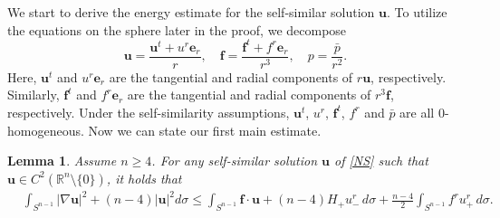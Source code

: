 \documentclass[12pt]{amsart}
\newtheorem{lemma}[theorem]{Lemma}
\newcommand{\Bu}{{\boldsymbol{u}}}
\newcommand{\Be}{{\boldsymbol{e}}}
\newcommand{\Bf}{{\boldsymbol{f}}}
\begin{document}
	
	
	
	
	
	
	
	
	We start to derive the energy estimate for the self-similar solution $\Bu$.  To utilize the equations on the sphere later in the proof, we
	decompose 
	$$\Bu = \frac{\Bu^{t} +u^r\Be_r}{r}, \quad \Bf = \frac{\Bf^{t}+f^r\Be_r}{r^3},\quad p=\frac{\bar{p}}{r^2}. $$ Here, 
	$\Bu^{t}$ and  $u^r\Be_r$ are the tangential and  radial components of $r\Bu$, respectively.  
	Similarly, $\Bf^{t}$ and 
	$ f^r\Be_r$ are the tangential and radial components of $r^3\Bf$, respectively.  Under the self-similarity assumptions, 
	$\Bu^{t}$, $u^r$, $\Bf^{t}$, 
	$ f^r$ and $\bar{p}$ are all  0-homogeneous. Now we can state our first main estimate.
	\begin{lemma}\label{halfenergyestimate}
		Assume $n\geq 4$.  For any self-similar solution $\Bu$ of \eqref{NS} such that $\Bu \in C^2(\mathbb{R}^n \setminus\{0\})$, it holds that 
		\begin{equation}\label{eq:keydec-2}
			\begin{aligned}
				&\int_{S^{n-1}} |\nabla \Bu|^2 +(n-4)|\Bu|^2 d\sigma			
				\leq 	\int_{S^{n-1}} \Bf\cdot \Bu + (n-4)H_{+} u^r_{-}\,  d\sigma + \frac{n-4}{2} \int_{S^{n-1}} f^r u^r_{+}\, d\sigma.
			\end{aligned}
		\end{equation}
	\end{lemma}
\end{document}
